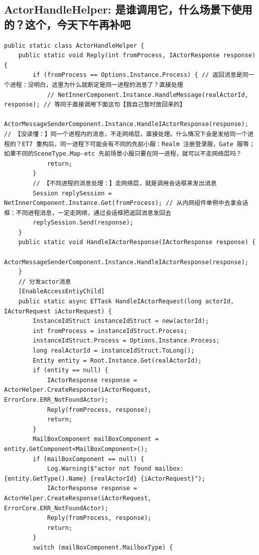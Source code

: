 \documentclass[9pt, b5paper]{article}
\begin{document}
\subsection{ActorHandleHelper: 是谁调用它，什么场景下使用的？这个，今天下午再补吧}
\label{sec-8-17}
\begin{verbatim}
public static class ActorHandleHelper {
    public static void Reply(int fromProcess, IActorResponse response) {
        if (fromProcess == Options.Instance.Process) { // 返回消息是同一个进程：没明白，这里为什么就断定是同一进程的消息了？直接处理
            // NetInnerComponent.Instance.HandleMessage(realActorId, response); // 等同于直接调用下面这句【我自己暂时放回来的】
            ActorMessageSenderComponent.Instance.HandleIActorResponse(response); // 【没读懂：】同一个进程内的消息，不走网络层，直接处理。什么情况下会是发给同一个进程的？ET7 重构后，同一进程下可能会有不同的先前小服：Realm 注册登录服，Gate 服等；如果不同的SceneType.Map-etc 先前场景小服只要在同一进程，就可以不走网络层吗？
            return;
        }
        // 【不同进程的消息处理：】走网络层，就是调用会话框来发出消息
        Session replySession = NetInnerComponent.Instance.Get(fromProcess); // 从内网组件单例中去拿会话框：不同进程消息，一定走网络，通过会话框把返回消息发回去
        replySession.Send(response);
    }
    public static void HandleIActorResponse(IActorResponse response) {
        ActorMessageSenderComponent.Instance.HandleIActorResponse(response);
    }
    // 分发actor消息
    [EnableAccessEntiyChild]
    public static async ETTask HandleIActorRequest(long actorId, IActorRequest iActorRequest) {
        InstanceIdStruct instanceIdStruct = new(actorId);
        int fromProcess = instanceIdStruct.Process;
        instanceIdStruct.Process = Options.Instance.Process;
        long realActorId = instanceIdStruct.ToLong();
        Entity entity = Root.Instance.Get(realActorId);
        if (entity == null) {
            IActorResponse response = ActorHelper.CreateResponse(iActorRequest, ErrorCore.ERR_NotFoundActor);
            Reply(fromProcess, response);
            return;
        }
        MailBoxComponent mailBoxComponent = entity.GetComponent<MailBoxComponent>();
        if (mailBoxComponent == null) {
            Log.Warning($"actor not found mailbox: {entity.GetType().Name} {realActorId} {iActorRequest}");
            IActorResponse response = ActorHelper.CreateResponse(iActorRequest, ErrorCore.ERR_NotFoundActor);
            Reply(fromProcess, response);
            return;
        }
        switch (mailBoxComponent.MailboxType) {

\end{verbatim}
\end{document}
